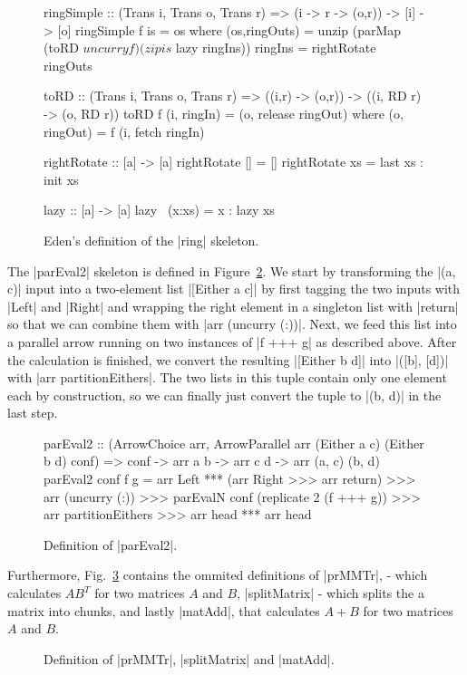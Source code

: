 \begin{figure}[h]
\begin{code}
ringSimple :: (Trans i, Trans o, Trans r) => (i -> r -> (o,r)) -> [i] -> [o]
ringSimple f is =  os
  where (os,ringOuts) = unzip (parMap (toRD $ uncurry f) (zip is $ lazy ringIns))
        ringIns = rightRotate ringOuts

toRD :: (Trans i, Trans o, Trans r) => ((i,r) -> (o,r)) -> ((i, RD r) -> (o, RD r))
toRD  f (i, ringIn)  = (o, release ringOut)
  where (o, ringOut) = f (i, fetch ringIn)

rightRotate    :: [a] -> [a]
rightRotate [] =  []
rightRotate xs =  last xs : init xs

lazy :: [a] -> [a]
lazy ~(x:xs) = x : lazy xs
\end{code}
\caption{Eden's definition of the |ring| skeleton.}
\label{fig:ringEden}
\end{figure}

The |parEval2| skeleton is defined in Figure~\ref{fig:parEval2}. 
We start by transforming the |(a, c)| input into a two-element list |[Either a c]| by first tagging the two inputs with |Left| and |Right| and wrapping the right element in a singleton list with |return| so that we can combine them with |arr (uncurry (:))|. Next, we feed this list into a parallel arrow running on two instances of |f +++ g| as described above. After the calculation is finished, we convert the resulting |[Either b d]| into |([b], [d])| with |arr partitionEithers|. The two lists in this tuple contain only one element each by construction, so we can finally just convert the tuple to |(b, d)| in the last step.
\begin{figure}[h]
\begin{code}
parEval2 :: (ArrowChoice arr,
	ArrowParallel arr (Either a c) (Either b d) conf) =>
	conf -> arr a b -> arr c d -> arr (a, c) (b, d)
parEval2 conf f g =
	arr Left *** (arr Right >>> arr return) >>>
	arr (uncurry (:)) >>>
	parEvalN conf (replicate 2 (f +++ g)) >>>
	arr partitionEithers >>>
	arr head *** arr head
\end{code}
	\caption{Definition of |parEval2|.}
	\label{fig:parEval2}
\end{figure}
Furthermore, Fig.~\ref{fig:torus_example_rest} contains the ommited definitions of |prMMTr|, - which calculates $AB^T$ for two matrices $A$ and $B$, |splitMatrix| - which splits the a matrix into chunks, and lastly |matAdd|, that calculates $A + B$ for two matrices $A$ and $B$.
\begin{figure}[h]
	\caption{Definition of |prMMTr|, |splitMatrix| and |matAdd|.}
	\label{fig:torus_example_rest}
\end{figure}

